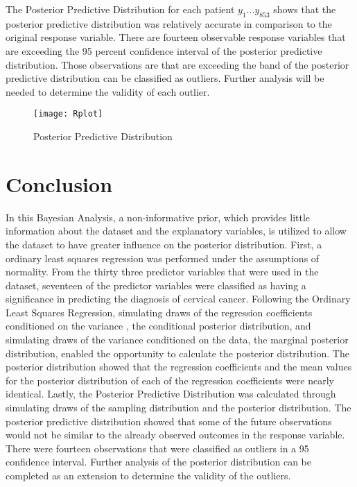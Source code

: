\documentclass[12pt]{article}
\numberwithin{equation}{section}
\begin{document}
The Posterior Predictive Distribution for each patient $y_1 ... y_{853}$ shows that the posterior predictive distribution was relatively accurate in comparison to the original response variable. There are fourteen observable response variables that are exceeding the 95 percent confidence interval of the posterior predictive distribution. Those observations are that are exceeding the band of the posterior predictive distribution can be classified as outliers. Further analysis will be needed to determine the validity of each outlier. 
\begin{figure}
\centering
\graphicspath{ {//Users/robbiemead/Documents/Graduate School/Courses/Spring 2022/MATH 574/Project/Math 574 Project/} }
\texttt{[image: Rplot]}
\caption{Posterior Predictive Distribution }
\end{figure}

\section{Conclusion}
In this Bayesian Analysis, a non-informative prior, which provides little information about the dataset and the explanatory variables, is utilized to allow the dataset to have greater influence on the posterior distribution. First, a ordinary least squares regression was performed under the assumptions of normality. From the thirty three predictor variables that were used in the dataset, seventeen of the predictor variables  were classified as having a significance in predicting the diagnosis of cervical cancer. Following the Ordinary Least Squares Regression, simulating draws of the regression coefficients conditioned on the variance , the conditional posterior distribution, and simulating draws of the variance conditioned on the data, the marginal posterior distribution, enabled the opportunity to calculate the posterior distribution. The posterior distribution showed that the regression coefficients and the mean values for the posterior distribution of each of the regression coefficients were nearly identical. Lastly, the Posterior Predictive Distribution was calculated through simulating  draws of the sampling distribution and the posterior distribution. The posterior predictive distribution showed that some of the future observations would not be similar to the already observed outcomes in the response variable. There were fourteen observations that were classified as outliers in a 95 confidence interval. Further analysis of the posterior distribution can be completed as an extension to determine the validity of the outliers. 
\end{document}
